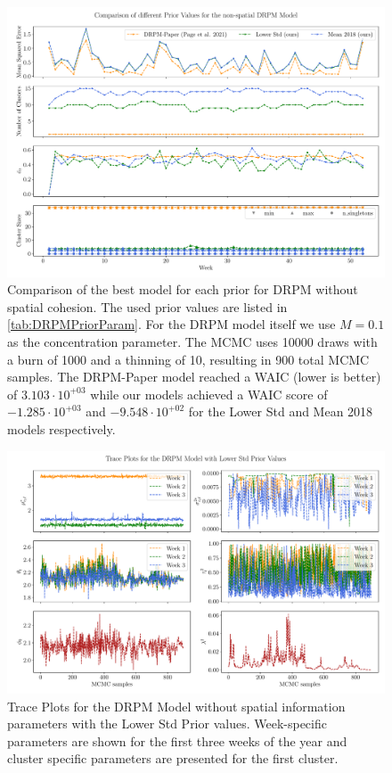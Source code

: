 \documentclass[12pt,a4paper]{article}
\begin{document}
\begin{figure}
    \centering
    \includegraphics[width=.95\linewidth]{./imgs/drpm/drpm_base_models_comparison.pdf}
    \caption{Comparison of the best model for each prior for DRPM without spatial cohesion.
    The used prior values are listed in \cref{tab:DRPMPriorParam}. For the DRPM model itself we use
    $M=0.1$ as the concentration parameter. The MCMC uses 10000 draws with a burn of 1000 and a
    thinning of 10, resulting in 900 total MCMC samples. The DRPM-Paper model reached a WAIC (lower is better) of
    $3.103 \cdot 10^{+03}$ while our models achieved a WAIC score of $-1.285 \cdot 10^{+03}$ and
    $-9.548 \cdot 10^{+02}$ for the Lower Std and Mean 2018 models respectively.}
    \label{fig:drpm_base_models_comparison}
\end{figure}

\begin{figure}
    \centering
    \includegraphics[width=.99\linewidth]{./imgs/drpm/drpm_lower_std_trace_plots.pdf}
    \caption{Trace Plots for the DRPM Model without spatial information parameters with the Lower Std Prior values. 
    Week-specific
    parameters are shown for the first three weeks of the year and cluster specific parameters are
    presented for the first cluster.}
    \label{fig:drpm_lower_std_trace_plots}
\end{figure}
\end{document}
